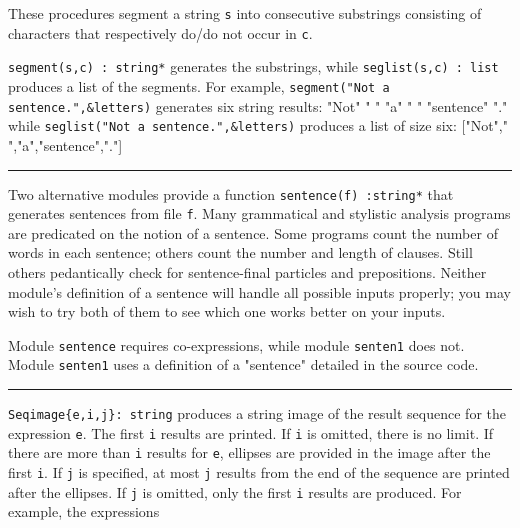 These procedures segment a string \texttt{s} into consecutive substrings
consisting of characters that respectively do/do not occur in
\texttt{c}.

\texttt{segment(s,c)}\texttt{ : string*} generates
the substrings, while \texttt{seglist(s,c) : list} produces a list of
the segments. For example, \texttt{segment("Not a
sentence.",\&letters)} generates six string results:
"Not" " "
"a" " "
"sentence" "."
while \texttt{seglist("Not a
sentence.",\&letters)} produces a list of size six:
["Not"," ","a","sentence","."]


\vspace{0.25cm}\hrule{}

Two alternative modules provide a function \texttt{sentence(f) :string*}
that generates sentences from file
\texttt{f}. Many grammatical and stylistic analysis programs are
predicated on the notion of a sentence. Some programs
count the number of words in each sentence; others count the number and
length of clauses. Still others pedantically check for sentence-final
particles and prepositions. Neither module's
definition of a sentence will handle all possible inputs properly; you
may wish to try both of them to see which one works better on your
inputs.

Module \texttt{sentence} requires co-expressions, while module
\texttt{senten1} does not. Module \texttt{senten1} uses a definition of
a "sentence" detailed in the source code.

\pagebreak

\vspace{0.25cm}\hrule{}

\texttt{Seqimage\{e,i,j\}: string} produces a string image of the result
sequence for the expression \texttt{e}.  The first \texttt{i}
results are printed. If \texttt{i} is omitted, there is no limit. If
there are more than \texttt{i} results for \texttt{e}, ellipses are
provided in the image after the first \texttt{i}. If \texttt{j} is
specified, at most \texttt{j} results from the end of the sequence are
printed after the ellipses. If \texttt{j} is omitted, only the first
\texttt{i} results are produced. For example, the expressions 


